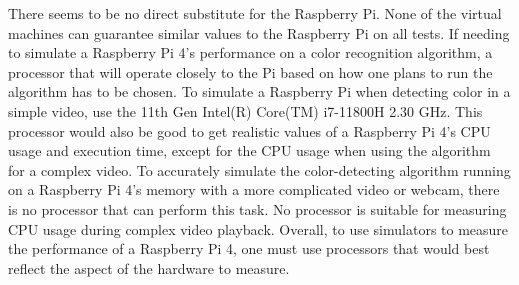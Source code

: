 There seems to be no direct substitute for the Raspberry Pi. None of the virtual machines can guarantee similar values to the Raspberry Pi on all tests. If needing to simulate a Raspberry Pi 4's performance on a color recognition algorithm, a processor that will operate closely to the Pi based on how one plans to run the algorithm has to be chosen. To simulate a Raspberry Pi when detecting color in a simple video, use the 11th Gen Intel(R) Core(TM) i7-11800H 2.30 GHz. This processor would also be good to get realistic values of a Raspberry Pi 4's CPU usage and execution time, except for the CPU usage when using the algorithm for a complex video. To accurately simulate the color-detecting algorithm running on a Raspberry Pi 4's memory with a more complicated video or webcam, there is no processor that can perform this task. No processor is suitable for measuring CPU usage during complex video playback. Overall, to use simulators to measure the performance of a Raspberry Pi 4, one must use processors that would best reflect the aspect of the hardware to measure.